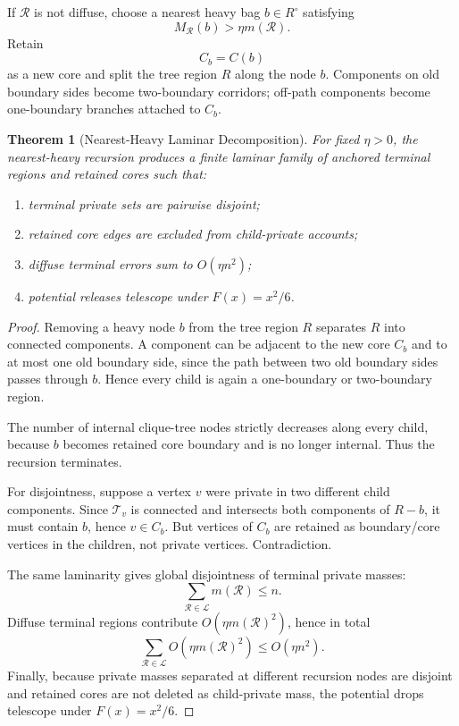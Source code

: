 \documentclass[11pt]{article}
\newtheorem{theorem}{Theorem}[section]
\theoremstyle{definition}
\newcommand{\calT}{\mathcal T}
\newcommand{\calR}{\mathcal R}
\newcommand{\calL}{\mathcal L}
\begin{document}
If \(\calR\) is not diffuse, choose a nearest heavy bag \(b\in R^\circ\) satisfying
\[
    M_{\calR}(b)>\eta m(\calR).
\]
Retain
\[
    C_b=C(b)
\]
as a new core and split the tree region \(R\) along the node \(b\). Components on old boundary sides become two-boundary corridors; off-path components become one-boundary branches attached to \(C_b\).

\begin{theorem}[Nearest-Heavy Laminar Decomposition]\label{thm:nearest-heavy}
For fixed \(\eta>0\), the nearest-heavy recursion produces a finite laminar family of anchored terminal regions and retained cores such that:
\begin{enumerate}[label=(\roman*)]
    \item terminal private sets are pairwise disjoint;
    \item retained core edges are excluded from child-private accounts;
    \item diffuse terminal errors sum to \(O(\eta n^2)\);
    \item potential releases telescope under \(F(x)=x^2/6\).
\end{enumerate}
\end{theorem}

\begin{proof}
Removing a heavy node \(b\) from the tree region \(R\) separates \(R\) into connected components. A component can be adjacent to the new core \(C_b\) and to at most one old boundary side, since the path between two old boundary sides passes through \(b\). Hence every child is again a one-boundary or two-boundary region.

The number of internal clique-tree nodes strictly decreases along every child, because \(b\) becomes retained core boundary and is no longer internal. Thus the recursion terminates.

For disjointness, suppose a vertex \(v\) were private in two different child components. Since \(\calT_v\) is connected and intersects both components of \(R-b\), it must contain \(b\), hence \(v\in C_b\). But vertices of \(C_b\) are retained as boundary/core vertices in the children, not private vertices. Contradiction.

The same laminarity gives global disjointness of terminal private masses:
\[
    \sum_{\calR\in\calL}m(\calR)\le n.
\]
Diffuse terminal regions contribute \(O(\eta m(\calR)^2)\), hence in total
\[
    \sum_{\calR\in\calL}O(\eta m(\calR)^2)
    \le
    O(\eta n^2).
\]
Finally, because private masses separated at different recursion nodes are disjoint and retained cores are not deleted as child-private mass, the potential drops telescope under \(F(x)=x^2/6\).
\end{proof}
\end{document}
